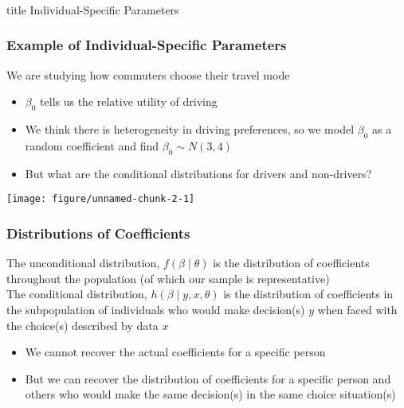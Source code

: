 \documentclass{beamer}\usepackage[]{graphicx}\usepackage[]{color}
\makeatletter
\def\maxwidth{ %
  \ifdim\Gin@nat@width>\linewidth
    \linewidth
  \else
    \Gin@nat@width
  \fi
}
\newenvironment{knitrout}{}{} %
\makeatother
\begin{document}
\begin{frame}\frametitle{}
    \vfill
    \centering
    \begin{beamercolorbox}[center]{title}
        \Large Individual-Specific Parameters
    \end{beamercolorbox}
    \vfill
\end{frame}

\begin{frame}[fragile]\frametitle{Example of Individual-Specific Parameters}
    We are studying how commuters choose their travel mode
    \begin{itemize}
         \item $\beta_0$ tells us the relative utility of driving
         \item We think there is heterogeneity in driving preferences, so we model $\beta_0$ as a random coefficient and find $\beta_0 \sim N(3, 4)$
         \item But what are the conditional distributions for drivers and non-drivers?
     \end{itemize} 
\begin{knitrout}\footnotesize
{}\color{fgcolor}
\texttt{[image: figure/unnamed-chunk-2-1]} 

\end{knitrout}
\end{frame}

\begin{frame}\frametitle{Distributions of Coefficients}
    The unconditional distribution, $f(\beta \mid \theta)$ is the distribution of coefficients throughout the population (of which our sample is representative) \\
    \vspace{3ex}
    The conditional distribution, $h(\beta \mid y, x, \theta)$ is the distribution of coefficients in the subpopulation of individuals who would make decision(s) $y$ when faced with the choice(s) described by data $x$
    \begin{itemize}
    	\item We cannot recover the actual coefficients for a specific person
    	\item But we can recover the distribution of coefficients for a specific person and others who would make the same decision(s) in the same choice situation(s)
    \end{itemize}
\end{frame}
\end{document}
